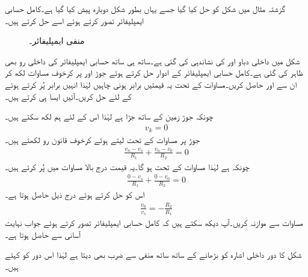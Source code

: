گزشتہ مثال میں شکل  کو حل کیا گیا جسے یہاں بطور شکل  دوبارہ پیش کیا گیا ہے۔کامل حسابی ایمپلیفائر تصور کرتے ہوئے اسے حل کرتے ہیں۔
\begin{figure}
\centering
{}
\caption{منفی ایمپلیفائر۔}
\label{شکل_حسابی_کامل_حل_الف}
\end{figure}
شکل میں داخلی دباو  اور  کی نشاندہی کی گئی ہے۔ساتھ ہی ساتھ حسابی ایمپلیفائر کی داخلی رو  بھی ظاہر کی گئی ہے۔کامل حسابی ایمپلیفائر کے ادوار حل کرتے ہوئے جوڑ  اور  پر کرخوف مساوات لکھ کر ان سے  اور  حاصل کریں۔مساوات  کے تحت یہ قیمتیں برابر ہونی چاہیں لہٰذا انہیں برابر پُر کرتے ہوئے  کے لئے حل کریں۔آئیں ایسا ہی کرتے ہیں۔

چونکہ جوڑ  زمین کے ساتھ جڑا ہے لہٰذا اس کے لئے ہم لکھ سکتے ہیں۔
\begin{align*}
v_k=0
\end{align*}
جوڑ  پر مساوات  کے تحت  لیتے ہوئے کرخوف قانون رو لکھتے ہیں۔
\begin{align*}
\frac{v_n-v_s}{R_1}+\frac{v_n-v_0}{R_2}=0
\end{align*}
چونکہ  ہے لہٰذا مساوات  کے تحت  ہو گا۔یہ قیمت درج بالا مساوات میں پُر کرتے ہیں۔
\begin{align*}
\frac{0-v_s}{R_1}+\frac{0-v_0}{R_2}=0
\end{align*}
اس کو حل کرتے ہوئے درج ذیل حاصل ہوتا ہے۔
\begin{align}
\frac{v_0}{v_s}=-\frac{R_2}{R_1}
\end{align}
مساوات  سے موازنہ کریں۔آپ دیکھ سکتے ہیں کہ کامل حسابی ایمپلیفائر تصور کرتے ہوئے جواب نہایت آسانی سے حاصل ہوتا ہے۔

شکل  کا دور  داخلی اشارہ  کو بڑھانے کے ساتھ ساتھ منفی سے ضرب بھی دیتا ہے لہٰذا اس دور کو  کہتے ہیں۔

